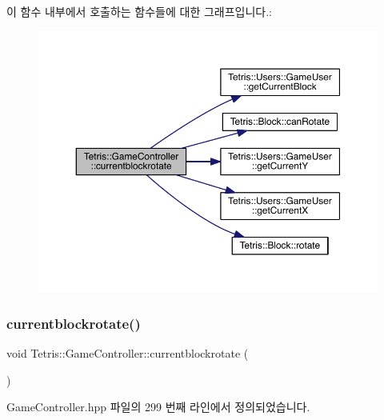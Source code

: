 이 함수 내부에서 호출하는 함수들에 대한 그래프입니다.\+:
\nopagebreak
\begin{figure}[H]
\begin{center}
\leavevmode
\includegraphics[width=350pt]{class_tetris_1_1_game_controller_a5d93facb945f87ba33fb8be74df023fa_cgraph}
\end{center}
\end{figure}
\mbox{\label{class_tetris_1_1_game_controller_a5d93facb945f87ba33fb8be74df023fa}} 
\subsubsection{\texorpdfstring{currentblockrotate()}{currentblockrotate()}\hspace{0.1cm}{\footnotesize\ttfamily [2/2]}}
{\footnotesize\ttfamily void Tetris\+::\+Game\+Controller\+::currentblockrotate (\begin{DoxyParamCaption}{ }\end{DoxyParamCaption})\hspace{0.3cm}{\ttfamily [inline]}}



Game\+Controller.\+hpp 파일의 299 번째 라인에서 정의되었습니다.

